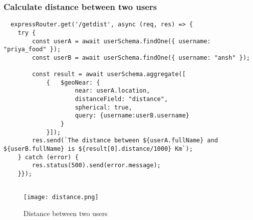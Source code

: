 \documentclass[12pt,a4paper]{article}
\begin{document}
\subsubsection{Calculate distance between two users}
\begin{lstlisting}
  expressRouter.get('/getdist', async (req, res) => {
    try {
        const userA = await userSchema.findOne({ username: "priya_food" });
        const userB = await userSchema.findOne({ username: "ansh" });

        const result = await userSchema.aggregate([
            {   $geoNear: {
                    near: userA.location,
                    distanceField: "distance",
                    spherical: true,
                    query: {username:userB.username}
                }
            }]);
        res.send(`The distance between ${userA.fullName} and ${userB.fullName} is ${result[0].distance/1000} Km`);
    } catch (error) {
        res.status(500).send(error.message);
    }});


\end{lstlisting}
\begin{figure}[H]
    \centering
    \texttt{[image: distance.png]}
    \caption{Distance between two users}
    \label{fig:sample}
\end{figure}
\end{document}
